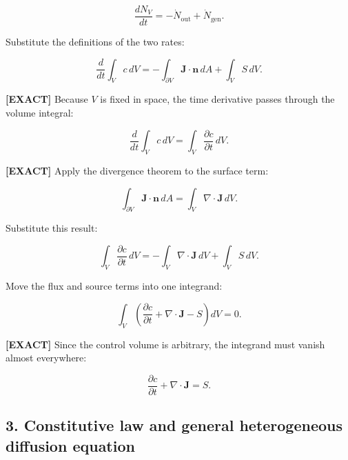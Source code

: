 \documentclass[11pt,a4paper]{article}
\begin{document}
\begin{equation}
\frac{dN_V}{dt}=-\dot N_{\mathrm{out}}+\dot N_{\mathrm{gen}}.
\tag{TRISO-GOV-027}
\label{eq:triso-gov-027}
\end{equation}

Substitute the definitions of the two rates:

\begin{equation}
\frac{d}{dt}\int_V c\,dV=-\int_{\partial V}\mathbf J\cdot\mathbf n\,dA+\int_V S\,dV.
\tag{TRISO-GOV-028}
\label{eq:triso-gov-028}
\end{equation}

\textbf{[EXACT]} Because $V$ is fixed in space, the time derivative passes through the volume integral:

\begin{equation}
\frac{d}{dt}\int_V c\,dV=\int_V\frac{\partial c}{\partial t}\,dV.
\tag{TRISO-GOV-029}
\label{eq:triso-gov-029}
\end{equation}

\textbf{[EXACT]} Apply the divergence theorem to the surface term:

\begin{equation}
\int_{\partial V}\mathbf J\cdot\mathbf n\,dA=\int_V\nabla\cdot\mathbf J\,dV.
\tag{TRISO-GOV-030}
\label{eq:triso-gov-030}
\end{equation}

Substitute this result:

\begin{equation}
\int_V\frac{\partial c}{\partial t}\,dV=-\int_V\nabla\cdot\mathbf J\,dV+\int_VS\,dV.
\tag{TRISO-GOV-031}
\label{eq:triso-gov-031}
\end{equation}

Move the flux and source terms into one integrand:

\begin{equation}
\int_V\left(\frac{\partial c}{\partial t}+\nabla\cdot\mathbf J-S\right)dV=0.
\tag{TRISO-GOV-032}
\label{eq:triso-gov-032}
\end{equation}

\textbf{[EXACT]} Since the control volume is arbitrary, the integrand must vanish almost everywhere:

\begin{equation}
\boxed{\frac{\partial c}{\partial t}+\nabla\cdot\mathbf J=S.}
\tag{TRISO-GOV-033}
\label{eq:triso-gov-033}
\end{equation}


\subsection*{3. Constitutive law and general heterogeneous diffusion equation}
\end{document}
